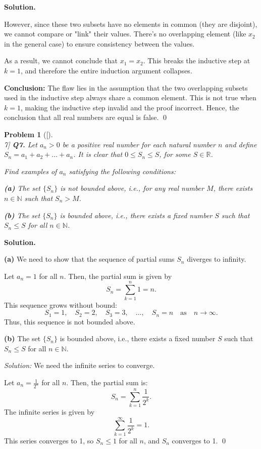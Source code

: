 \documentclass[12pt]{article}
\newtheorem{problemx}{Problem}
\newenvironment{problem}[1]{%
	\begin{problemx}[#1]\leavevmode\\[0.5em] %
	}{%
	\end{problemx}
}
\newenvironment{solution}{%
	\par\medskip
	\noindent\textbf{Solution.}\par\nopagebreak
}{%
	\hfill \qed \par\medskip
}
\begin{document}
\begin{solution}
	However, since these two subsets have no elements in common (they are disjoint), we cannot compare or "link" their values. There's no overlapping element (like \( x_2 \) in the general case) to ensure consistency between the values.
	
	As a result, we cannot conclude that \( x_1 = x_2 \). This breaks the inductive step at \( k = 1 \), and therefore the entire induction argument collapses.
	
	\textbf{Conclusion:}  
	The flaw lies in the assumption that the two overlapping subsets used in the inductive step always share a common element. This is not true when \( k = 1 \), making the inductive step invalid and the proof incorrect. Hence, the conclusion that all real numbers are equal is false.
\end{solution}

	
	\begin{problem}[7]
\textbf{Q7.} Let $a_n > 0$ be a positive real number for each natural number $n$ and define $S_n = a_1 + a_2 + \dots + a_n$. It is clear that $0 \leq S_n \leq S$, for some $S \in \mathbb{R}$.

Find examples of $a_n$ satisfying the following conditions:

\textbf{(a)} The set $\{S_n\}$ is not bounded above, i.e., for any real number $M$, there exists $n \in \mathbb{N}$ such that $S_n > M$.

\textbf{(b)} The set $\{S_n\}$ is bounded above, i.e., there exists a fixed number $S$ such that $S_n \leq S$ for all $n \in \mathbb{N}$.
	\end{problem}
	
	\begin{solution}
		
		\textbf{(a)} We need to show that the sequence of partial sums $S_n$ diverges to infinity.

Let $a_n = 1$ for all $n$. Then, the partial sum is given by
$$S_n = \sum_{k=1}^{n} 1 = n.$$
This sequence grows without bound:
$$S_1 = 1, \quad S_2 = 2, \quad S_3 = 3, \quad \dots, \quad S_n = n \quad \text{as} \quad n \to \infty.$$
Thus, this sequence is not bounded above.

\textbf{(b)} The set $\{S_n\}$ is bounded above, i.e., there exists a fixed number $S$ such that $S_n \leq S$ for all $n \in \mathbb{N}$.

\textit{Solution:} We need the infinite series to converge. 

Let $a_n = \frac{1}{2^n}$ for all $n$. Then, the partial sum is:
$$S_n = \sum_{k=1}^{n} \frac{1}{2^k}.$$
The infinite series is given by
$$\sum_{k=1}^{\infty} \frac{1}{2^k} = 1.$$
This series converges to 1, so $S_n \leq 1$ for all $n$, and $S_n$ converges to 1.
	\end{solution}
	
\end{document}
